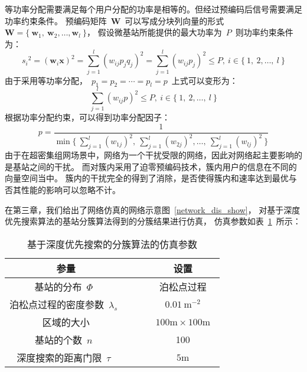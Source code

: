 等功率分配需要满足每个用户分配的功率是相等的。但经过预编码后信号需要满足功率约束条件。
预编码矩阵~$\mathbf{W}$~可以写成分块列向量的形式
~$\mathbf{W}=\{~\mathbf{w}_1,~\mathbf{w}_2,\dots,\mathbf{w}_l~\}$，
假设微基站所能提供的最大功率为~$P$~则功率约束条件为：
\begin{equation}\label{P_constrain}
  {s_i}^2 = (\mathbf{w}_i \mathbf{x})^2 = \sum_{j=1}^l (w_{ij} p_j q_j)^2
  = \sum_{j=1}^l (w_{ij} p_j)^2 \leq P ,~ i\in \{~1,~2, \dots, ~l~\}
\end{equation}
由于采用等功率分配，~$p_1=p_2=\cdots=p_l=p$~上式可以变形为：
\begin{equation}
  \sum_{j=1}^{l} (w_{ij}p)^2 \le P ,~ i\in \{~1,~2, \dots, ~l~\}
\end{equation}
根据功率分配约束，可以得到功率分配因子：
\begin{equation}
  p=\frac{1}{\min\{~\sum_{j=1}^{l} (w_{1j})^2,~\sum_{j=1}^{l} (w_{2j})^2,\dots,~\sum_{j=1}^{l} (w_{lj})^2~\}}
\end{equation}
由于在超密集组网场景中，网络为一个干扰受限的网络，因此对网络起主要影响的是基站之间的干扰。
而对簇内采用了迫零预编码技术，簇内用户的信息在不同的向量空间当中。
簇内的干扰完全的得到了消除，是否使得簇内和速率达到最优与否其性能的影响可以忽略不计。


在第三章，我们给出了网络仿真的网络示意图~\ref{network_dis_show}，
对基于深度优先搜索算法的基站分簇算法得到的分簇结果进行仿真，
仿真参数如表~\ref{dfs_show_sim_para}~所示：
\begin{table}[htbp]
\caption{基于深度优先搜索的分簇算法的仿真参数}
\label{dfs_show_sim_para}
\vspace{0.5em}\centering\wuhao
\begin{tabular}{cccc}
\toprule[1.5pt]
参量 & & & 设置 \\
\midrule[0.5pt]
基站的分布~$\Phi$~ & & & 泊松点过程 \\
泊松点过程的密度参数~$\lambda_s$~ & & & ~$0.01~\mathrm{m}^{-2}$~ \\
区域的大小  & & & ~$100\mathrm{m} \times 100 \mathrm{m}$~ \\
基站的个数~$n$~  & & & 100\\
深度搜索的距离门限~$\tau$~ & & & ~$5\mathrm{m}$~\\
\bottomrule[1.5pt]
\end{tabular}
\end{table}

